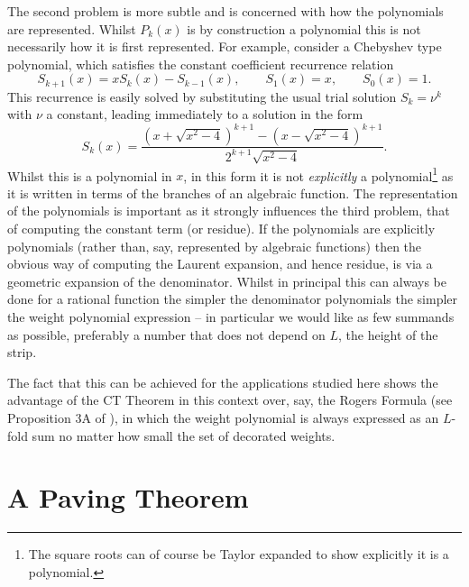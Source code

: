 \documentclass[11pt,a4paper]{article}
\begin{document}
The second problem is more subtle and is concerned with how the polynomials are represented. Whilst $P_{k}(x)$ is by construction a  polynomial  this is not necessarily how it is first represented. For example, 
consider   a  Chebyshev type polynomial,
which satisfies the constant coefficient recurrence relation
\begin{equation} \label{eq:Sk1}
S_{k+1}(x)=x S_k(x)- S_{k-1}(x),\qquad S_1(x)=x,\qquad S_0(x)=1.
\end{equation}
This recurrence is easily solved by substituting the usual trial solution $S_k=\nu^k$ with $\nu$ a constant, leading immediately to a solution in  the form
\begin{equation} 
S_k(x)=\frac{(x+\sqrt{x^2-4})^{k+1}-(x-\sqrt{x^2-4})^{k+1}}{2^{k+1}\sqrt{x^2-4}}.
\label{eq_chebEx}	
\end{equation}
Whilst this is a polynomial in $x$, in this form it is not \emph{explicitly} a polynomial\footnote{The square roots can of course be  Taylor expanded to show explicitly it is a polynomial.} as it is written in terms of the branches of an algebraic function. The representation of the polynomials is important as it strongly influences the third problem, that of computing the constant term (or residue).  If the polynomials are explicitly polynomials (rather than, say, represented by algebraic functions) then the obvious way of computing the Laurent expansion, and hence residue, is via a geometric expansion of the denominator. Whilst in principal this can always be done for a rational function the simpler the denominator polynomials the simpler the weight polynomial expression -- in particular we would like as few summands as possible, preferably a number that does not depend on  $L$, the height of the strip.
  
The fact that this can be achieved for the applications studied here  shows the advantage of the CT  Theorem in this context  over, say, the Rogers Formula \cite{rogers:1907rc} (see Proposition 3A of \cite{Flajolet1980rr}), in which the weight polynomial is always expressed as an $L$-fold sum no matter how small the set of decorated weights.


\section{A Paving Theorem} 
\label{sec:paving_theorem}
\end{document}
